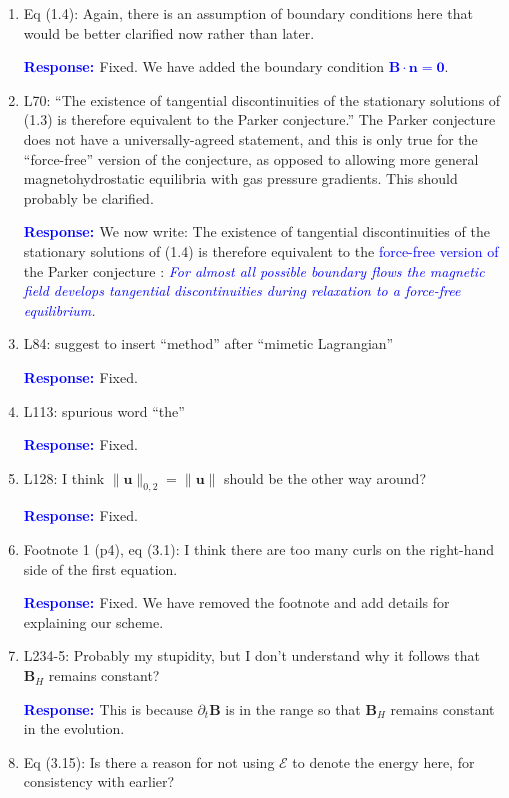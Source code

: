 \documentclass{article}
\theoremstyle{definition}
\newcommand{\rv}[1]{%
  \colorbox{gray!20}{%
    \parbox{0.96\linewidth}{%
      \small #1
    }%
  }%
}
\newcommand{\rp}{\textbf{\textcolor{blue}{Response: }}}
\newcommand{\blue}[1]{\textcolor{blue}{#1}}
\begin{document}
\begin{enumerate}
\item \rv{Eq (1.4): Again, there is an assumption of boundary conditions here that would be better
clarified now rather than later.}

\rp Fixed. We have added the boundary condition \blue{$\bm B\cdot \bm n = \bm 0$}. 

\item \rv{L70: “The existence of tangential discontinuities of the stationary solutions of (1.3) is
therefore equivalent to the Parker conjecture.” The Parker conjecture does not have
a universally-agreed statement, and this is only true for the “force-free” version of the
conjecture, as opposed to allowing more general magnetohydrostatic equilibria with gas
pressure gradients. This should probably be clarified.}

\rp We now write: The existence of tangential discontinuities of the stationary solutions of (1.4) is therefore equivalent to the \blue{force-free version of} the Parker conjecture \cite[Def.~2]{pontinParkerProblemExistence2020}:
\blue{\emph{For almost all possible boundary flows the magnetic field develops tangential discontinuities during relaxation to a force-free equilibrium.}}

\item \rv{L84: suggest to insert “method” after “mimetic Lagrangian”}

\rp Fixed. 

\item \rv{L113: spurious word “the”}

\rp Fixed.

\item \rv{L128: I think $\|\bm u\|_{0, 2} = \|\bm u\|$ should be the other way around?}

\rp Fixed.

\item \rv{Footnote 1 (p4), eq (3.1): I think there are too many curls on the right-hand side of the
first equation.}

\rp Fixed. We have removed the footnote and add details for explaining our scheme. 

\item \rv{L234-5: Probably my stupidity, but I don’t understand why it follows that $\bm B_H$ remains
constant?}

\rp This is because $\partial_t \bm B$ is in the range so that $\bm B_H$ remains constant in the evolution.

\item \rv{Eq (3.15): Is there a reason for not using $\mathcal{E}$ to denote the energy here, for consistency with
earlier?}


\end{enumerate}
\end{document}
